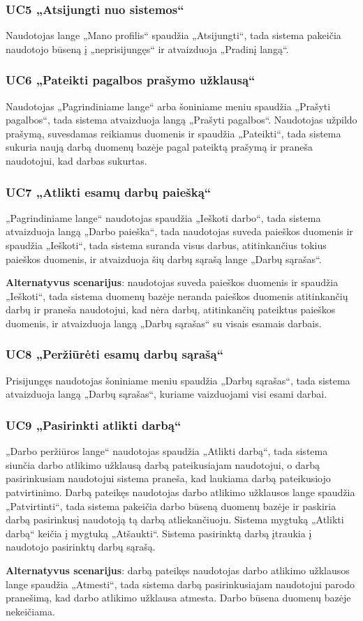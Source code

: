 \documentclass{VUMIFPSbakalaurinis}
\begin{document}
\subsubsection{UC5 „Atsijungti nuo sistemos“}
Naudotojas lange „Mano profilis“ spaudžia „Atsijungti“, tada sistema pakeičia naudotojo būseną į „neprisijungęs“ ir atvaizduoja „Pradinį langą“.
\subsubsection{UC6 „Pateikti pagalbos prašymo užklausą“}
Naudotojas „Pagrindiniame lange“ arba šoniniame meniu spaudžia „Prašyti pagalbos“, tada sistema atvaizduoja langą „Prašyti pagalbos“. Naudotojas užpildo prašymą, suvesdamas reikiamus duomenis ir spaudžia „Pateikti“, tada sistema sukuria naują darbą duomenų bazėje pagal pateiktą prašymą ir praneša naudotojui, kad darbas sukurtas.
\subsubsection{UC7 „Atlikti esamų darbų paiešką“}
„Pagrindiniame lange“ naudotojas spaudžia „Ieškoti darbo“, tada sistema atvaizduoja langą „Darbo paieška“, tada naudotojas suveda paieškos duomenis ir spaudžia „Ieškoti“, tada sistema suranda visus darbus, atitinkančius tokius paieškos duomenis, ir atvaizduoja šių darbų sąrašą lange „Darbų sąrašas“. 
\par \textbf{Alternatyvus scenarijus}: naudotojas suveda paieškos duomenis ir spaudžia „Ieškoti“, tada sistema duomenų bazėje neranda paieškos duomenis atitinkančių darbų ir praneša naudotojui, kad nėra darbų, atitinkančių pateiktus paieškos duomenis, ir atvaizduoja langą „Darbų sąrašas“ su visais esamais darbais.
\subsubsection{UC8 „Peržiūrėti esamų darbų sąrašą“}
Prisijungęs naudotojas šoniniame meniu spaudžia „Darbų sąrašas“, tada sistema atvaizduoja langą „Darbų sąrašas“, kuriame vaizduojami visi esami darbai.
\subsubsection{UC9 „Pasirinkti atlikti darbą“}
„Darbo peržiūros lange“ naudotojas spaudžia „Atlikti darbą“, tada sistema siunčia darbo atlikimo užklausą darbą pateikusiajam naudotojui, o darbą pasirinkusiam naudotojui sistema praneša, kad laukiama darbą pateikusiojo patvirtinimo. Darbą pateikęs naudotojas darbo atlikimo užklausos lange spaudžia „Patvirtinti“, tada sistema pakeičia darbo būseną duomenų bazėje ir paskiria darbą pasirinkusį naudotoją tą darbą atliekančiuoju. Sistema mygtuką „Atlikti darbą“ keičia į mygtuką „Atšaukti“. Sistema pasirinktą darbą įtraukia į naudotojo pasirinktų darbų sąrašą. 
\par \textbf{Alternatyvus scenarijus}: darbą pateikęs naudotojas darbo atlikimo užklausos lange spaudžia „Atmesti“, tada sistema darbą pasirinkusiajam naudotojui parodo pranešimą, kad darbo atlikimo užklausa atmesta. Darbo būsena duomenų bazėje nekeičiama.
\end{document}
